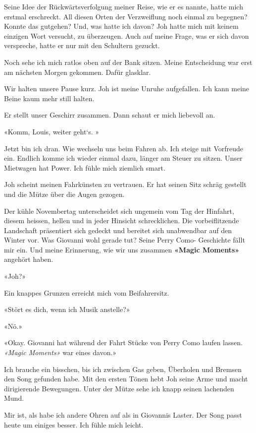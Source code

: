 Seine Idee der Rückwärtsverfolgung meiner Reise, wie er es nannte, hatte
mich erstmal erschreckt. All diesen Orten der Verzweiflung noch einmal
zu begegnen? Konnte das gutgehen? Und, was hatte ich davon? Joh hatte
mich mit keinem einzigen Wort versucht, zu überzeugen. Auch auf meine
Frage, was er sich davon verspreche, hatte er nur mit den Schultern
gezuckt.

Noch sehe ich mich ratlos oben auf der Bank sitzen. Meine Entscheidung
war erst am nächsten Morgen gekommen. Dafür glasklar.

Wir halten unsere Pause kurz. Joh ist meine Unruhe aufgefallen. Ich kann
meine Beine kaum mehr still halten.

Er stellt unser Geschirr zusammen. Dann schaut er mich liebevoll an.

«Komm, Louis, weiter geht`s. »

Jetzt bin ich dran. Wie wechseln uns beim Fahren ab. Ich steige mit
Vorfreude ein. Endlich komme ich wieder einmal dazu, länger am Steuer zu
sitzen. Unser Mietwagen hat Power. Ich fühle mich ziemlich smart.

Joh scheint meinen Fahrkünsten zu vertrauen. Er hat seinen Sitz schräg
gestellt und die Mütze über die Augen gezogen.

Der kühle Novembertag unterscheidet sich ungemein vom Tag der Hinfahrt,
diesem heissen, hellen und in jeder Hinsicht schrecklichen. Die
vorbeiflitzende Landschaft präsentiert sich gedeckt und bereitet sich
unabwendbar auf den Winter vor. Was Giovanni wohl gerade tut? Seine
Perry Como- Geschichte fällt mir ein. Und meine Erinnerung, wie wir uns
zusammen \textbf{«Magic Moments»} angehört haben.

«Joh?»

Ein knappes Grunzen erreicht mich vom Beifahrersitz.

«Stört es dich, wenn ich Musik anstelle?»

«Nö.»

«Okay. Giovanni hat während der Fahrt Stücke von Perry Como laufen
lassen. \emph{«Magic Moments»} war eines davon.»

Ich brauche ein bisschen, bis ich zwischen Gas geben, Überholen und
Bremsen den Song gefunden habe. Mit den ersten Tönen hebt Joh seine Arme
und macht dirigierende Bewegungen. Unter der Mütze sehe ich knapp seinen
lachenden Mund.

Mir ist, als habe ich andere Ohren auf als in Giovannis Laster. Der Song
passt heute um einiges besser. Ich fühle mich leicht.

